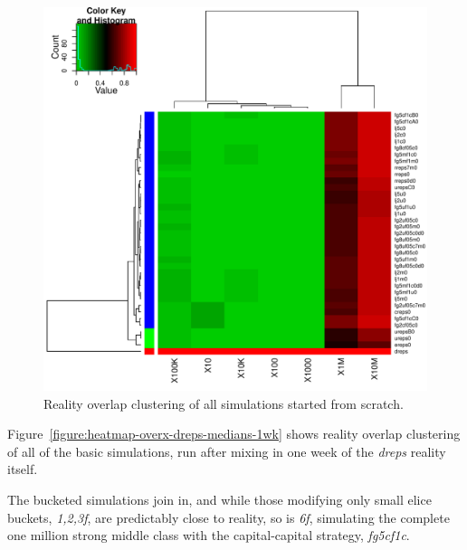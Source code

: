 \documentclass[10pt,oneside]{memoir}
\begin{document}
\begin{Spacing}{2}
\begin{figure}
\begin{center}
    \includegraphics{figures/heatmap-overx-dreps-medians-0wk}
    \caption{Reality overlap clustering of all simulations started from scratch.}
    \label{figure:heatmap-overx-dreps-medians-0wk}
\end{center}
\end{figure}
Figure~\ref{figure:heatmap-overx-dreps-medians-1wk} shows reality overlap clustering of all of the basic simulations, run after mixing in one week of the {\itshape dreps} reality itself.


The bucketed simulations join in, and while those modifying only small elice buckets, {\itshape {1,2,3}f}, are predictably close to reality, so is {\itshape 6f}, simulating the complete one million strong middle class with the capital-capital strategy, {\itshape fg5cf1c}.




\end{Spacing}
\end{document}
